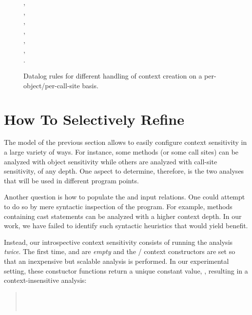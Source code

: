 \begin{figure}[h!tp]
\begin{datalog}
    , \\
    , \\
    ,\\
    , \\
    ,\\
    , \\
    .
\end{datalog}
\caption[Datalog rules for context creation on a per-object/per-call-site basis]{Datalog rules for different handling of context creation on a per-object/per-call-site basis.}
\label{fig:introspect:rules}
\end{figure}


\section{How To Selectively Refine}
\label{sec:introspect:heuristics}

The model of the previous section allows to easily configure context sensitivity in a large variety of ways. For instance, some methods (or some call sites) can be analyzed with object sensitivity while others are analyzed with call-site sensitivity, of any depth. One aspect to determine, therefore, is the two analyses that will be used in different program points.

Another question is how to populate the  and  input relations. One could attempt to do so by mere syntactic inspection of the program. For example, methods containing cast statements can be analyzed with a higher context depth. In our work, we have failed to identify such syntactic heuristics that would yield benefit.

Instead, our introspective context sensitivity consists of running the analysis \emph{twice}. The first time,  and  are \emph{empty} and the / context constructors are set so that an inexpensive but scalable analysis is performed. In our experimental setting, these constuctor functions return a unique constant value, \args{$\star$}, resulting in a context-insensitive analysis:

\begin{quote}
\\
 \\
\end{quote}

